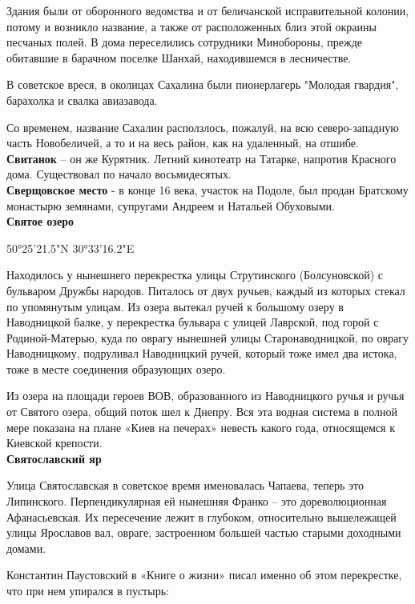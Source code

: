 Здания были от оборонного ведомства и от беличанской исправительной колонии, потому и возникло название, а также от расположенных близ этой окраины песчаных полей. В дома переселились сотрудники Минобороны, прежде обитавшие в барачном поселке Шанхай, находившемся в лесничестве. 

В советское вреся, в околицах Сахалина были пионерлагерь "Молодая гвардия", барахолка и свалка авиазавода.

Со временем, название Сахалин расползлось, пожалуй, на всю северо-западную часть Новобеличей, а то и на весь район, как на удаленный, на отшибе.\\

\textbf{Свитанок} – он же Курятник. Летний кинотеатр на Татарке, напротив Красного дома. Существовал по начало восьмидесятых.\\

\textbf{Сверщовское место} - в конце 16 века, участок на Подоле, был продан Братскому монастырю земянами, супругами Андреем и Натальей Обуховыми.\\

\textbf{Святое озеро}

50°25'21.5"N 30°33'16.2"E

Находилось у нынешнего  перекрестка улицы Струтинского (Болсуновской) с бульваром Дружбы народов. Питалось от двух ручьев, каждый из которых стекал по упомянутым улицам. Из озера вытекал ручей к большому озеру в Наводницкой балке, у перекрестка бульвара с улицей Лаврской, под горой с Родиной-Матерью, куда по оврагу нынешней улицы Старонаводницкой, по оврагу Наводницкому, подруливал Наводницкий ручей, который тоже имел два истока, тоже в месте соединения образующих озеро. 

Из озера на площади героев ВОВ, образованного из Наводницкого ручья и ручья от Святого озера, общий поток шел к Днепру. Вся эта водная система в полной мере показана на плане «Киев на печерах» невесть какого года, относящемся к Киевской крепости.\\

\textbf{Святославский яр}

Улица Святославская в советское время именовалась Чапаева, теперь это Липинского. Перпендикулярная ей нынешняя Франко – это дореволюционная Афанасьевская. Их пересечение лежит в глубоком, относительно вышележащей улицы Ярославов вал, овраге, застроенном большей частью старыми доходными домами.

Константин Паустовский в «Книге о жизни» писал именно об этом перекрестке, что при нем упирался в пустырь:

